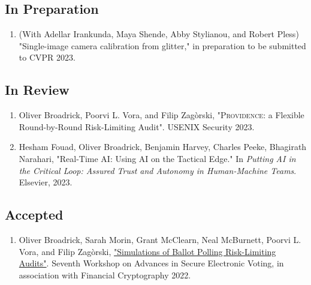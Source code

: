 \documentclass[letterpaper]{article}
\begin{document}
\subsection*{In Preparation}
\begin{enumerate}
\item
(With Adellar Irankunda, Maya Shende, Abby Stylianou, and Robert Pless) "Single-image camera calibration from glitter," in preparation to be submitted to CVPR 2023.
\end{enumerate}

\subsection*{In Review}
\begin{enumerate}
\item
Oliver Broadrick, Poorvi L. Vora, and Filip Zag\`{o}rski, "\textsc{Providence}: a Flexible Round-by-Round Risk-Limiting Audit". USENIX Security 2023.
\item
Hesham Fouad, Oliver Broadrick, Benjamin Harvey, Charles Peeke, Bhagirath Narahari, "Real-Time AI: Using AI on the Tactical Edge." In \emph{Putting AI in the Critical Loop: Assured Trust and Autonomy in Human-Machine Teams}. Elsevier, 2023.
\end{enumerate}

\subsection*{Accepted}
\begin{enumerate}
\item Oliver Broadrick, Sarah Morin, Grant McClearn, Neal McBurnett, Poorvi L. Vora, and Filip Zag\`{o}rski, \href{https://oliverbroadrick.com/papers/simulations-of-ballot-polling-rlas.pdf}{"Simulations of Ballot Polling Risk-Limiting Audits"}. Seventh Workshop on Advances in Secure Electronic Voting, in association with Financial Cryptography 2022.
\end{enumerate}

\bigskip
\end{document}
